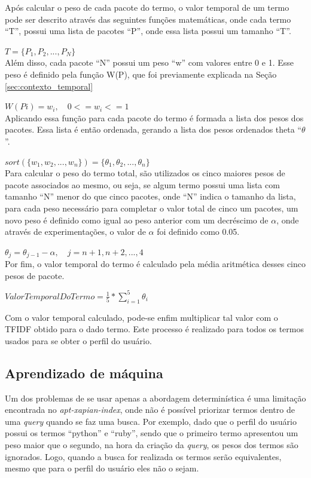 Após calcular o peso de cada pacote do termo, o valor temporal de um termo pode ser
descrito através das seguintes funções matemáticas, onde cada termo ``T'', possui uma
lista de pacotes ``P'', onde essa lista possui um tamanho ``T''.

$T = \{P_1, P_2, ..., P_N\}$
\\

Além disso, cada pacote ``N'' possui um peso ``w'' com valores entre 0 e 1. Esse peso
é definido pela função W(P), que foi previamente explicada na Seção
\ref{sec:contexto_temporal}

$W(Pi) = w_i , \quad 0 <= w_i <= 1$
\\

Aplicando essa função para cada pacote do termo é formada a lista dos pesos
dos pacotes. Essa lista é então ordenada, gerando a lista
dos pesos ordenados theta ``$\theta$''.

$sort(\{w_1, w_2, ..., w_n\}) = \{\theta_1, \theta_2, ..., \theta_n\}$
\\

Para calcular o peso do termo total, são utilizados os cinco maiores pesos de pacote
associados ao mesmo, ou seja, se algum termo possui uma lista com tamanho ``N''
menor do que cinco pacotes, onde ``N'' indica o tamanho da lista, para cada peso
necessário para completar o valor total de cinco um pacotes, um novo peso
é definido como igual ao peso anterior com um decréscimo de $\alpha$, onde
através de experimentações, o valor de $\alpha$ foi definido como 0.05.

$\theta_j = \theta_{j-1} - \alpha , \quad j = n+1, n+2, ..., 4$
\\

Por fim, o valor temporal do termo é calculado pela média aritmética desses
cinco pesos de pacote.

$ValorTemporalDoTermo = \frac{1}{5} * \sum\limits_{i=1}^{5} \theta_i$

Com o valor temporal calculado, pode-se enfim multiplicar tal valor com o TFIDF
obtido para o dado termo. Este processo é realizado para todos os termos usados
para se obter o perfil do usuário.

\subsection{Aprendizado de máquina}

Um dos problemas de se usar apenas a abordagem determinística é uma limitação
encontrada no \textit{apt-xapian-index}, onde não é possível priorizar termos
dentro de uma \textit{query} quando se faz uma busca. Por exemplo, dado que o perfil
do usuário possui os termos ``python'' e ``ruby'', sendo que o primeiro termo
apresentou um peso maior que o segundo, na hora da criação da \textit{query}, os pesos
dos termos são ignorados. Logo, quando a busca for realizada os termos serão
equivalentes, mesmo que para o perfil do usuário eles não o sejam.

